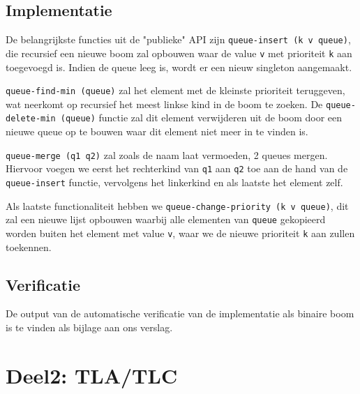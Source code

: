\documentclass[a4paper,10pt]{article}
\begin{document}
\subsection{Implementatie}

De belangrijkste functies uit de "publieke" API zijn \texttt{queue-insert (k v
queue)}, die recursief een nieuwe boom zal opbouwen waar de value \texttt{v} met
prioriteit \texttt{k} aan toegevoegd is. Indien de queue leeg is, wordt er een
nieuw singleton aangemaakt.

\texttt{queue-find-min (queue)} zal het element met de kleinste prioriteit
teruggeven, wat neerkomt op recursief het meest linkse kind in de boom te
zoeken. De \texttt{queue-delete-min (queue)} functie zal dit element verwijderen
uit de boom door een nieuwe queue op te bouwen waar dit element niet meer in te
vinden is.

\texttt{queue-merge (q1 q2)} zal zoals de naam laat vermoeden, 2 queues mergen.
Hiervoor voegen we eerst het rechterkind van \texttt{q1} aan \texttt{q2} toe aan
de hand van de \texttt{queue-insert} functie, vervolgens het linkerkind en als
laatste het element zelf.

Als laatste functionaliteit hebben we \texttt{queue-change-priority (k v
queue)}, dit zal een nieuwe lijst opbouwen waarbij alle elementen van
\texttt{queue} gekopieerd worden buiten het element met value \texttt{v}, waar
we de nieuwe prioriteit \texttt{k} aan zullen toekennen.

\subsection{Verificatie}

De output van de automatische verificatie van de implementatie als binaire boom
is te vinden als bijlage aan ons verslag.

\section{Deel2: TLA/TLC}
\end{document}
